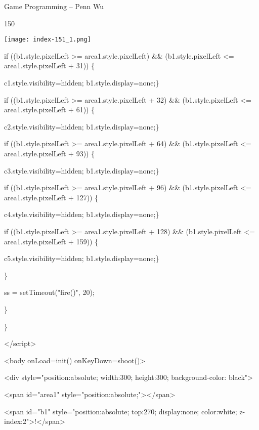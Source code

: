 \documentclass[
]{article}
\begin{document}
Game Programming -- Penn Wu

150

\protect\hypertarget{index_split_009.htmlux5cux23p151}{}{}\texttt{[image: index-151\_1.png]}

if ((b1.style.pixelLeft \textgreater= area1.style.pixelLeft) \&\&
(b1.style.pixelLeft \textless= area1.style.pixelLeft + 31)) \{

c1.style.visibility=\textquotesingle hidden\textquotesingle;
b1.style.display=\textquotesingle none\textquotesingle;\}

if ((b1.style.pixelLeft \textgreater= area1.style.pixelLeft + 32) \&\&
(b1.style.pixelLeft \textless= area1.style.pixelLeft + 61)) \{

c2.style.visibility=\textquotesingle hidden\textquotesingle;
b1.style.display=\textquotesingle none\textquotesingle;\}

if ((b1.style.pixelLeft \textgreater= area1.style.pixelLeft + 64) \&\&
(b1.style.pixelLeft \textless= area1.style.pixelLeft + 93)) \{

c3.style.visibility=\textquotesingle hidden\textquotesingle;
b1.style.display=\textquotesingle none\textquotesingle;\}

if ((b1.style.pixelLeft \textgreater= area1.style.pixelLeft + 96) \&\&
(b1.style.pixelLeft \textless= area1.style.pixelLeft + 127)) \{

c4.style.visibility=\textquotesingle hidden\textquotesingle;
b1.style.display=\textquotesingle none\textquotesingle;\}

if ((b1.style.pixelLeft \textgreater= area1.style.pixelLeft + 128) \&\&
(b1.style.pixelLeft \textless= area1.style.pixelLeft + 159)) \{

c5.style.visibility=\textquotesingle hidden\textquotesingle;
b1.style.display=\textquotesingle none\textquotesingle;\}

\}

ss = setTimeout("fire()", 20);

\}

\}

\textless/script\textgreater{}

\textless body onLoad=init() onKeyDown=shoot()\textgreater{}

\textless div style="position:absolute; width:300; height:300;
background-color: black"\textgreater{}

\textless span id="area1"
style="position:absolute;"\textgreater\textless/span\textgreater{}

\textless span id="b1" style="position:absolute; top:270; display:none;
color:white; z-index:2"\textgreater!\textless/span\textgreater{}
\end{document}
